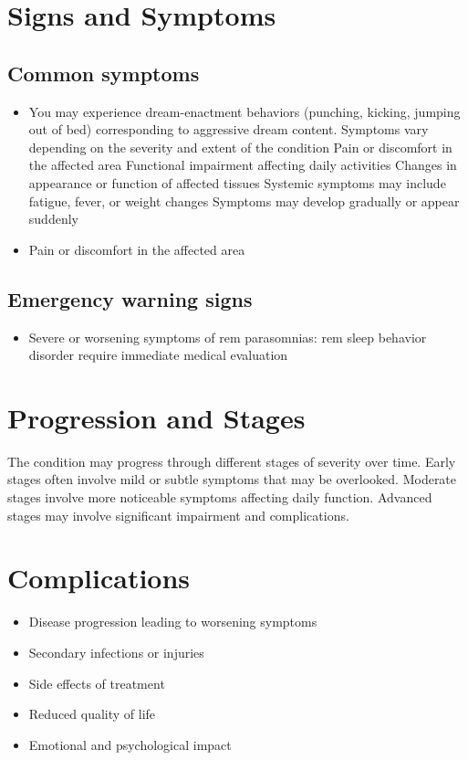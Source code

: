 \section{Signs and Symptoms}

\subsection{Common symptoms}
\begin{itemize}[noitemsep]
  \item You may experience dream-enactment behaviors (punching, kicking, jumping out of bed) corresponding to aggressive dream content. Symptoms vary depending on the severity and extent of the condition Pain or discomfort in the affected area Functional impairment affecting daily activities Changes in appearance or function of affected tissues Systemic symptoms may include fatigue, fever, or weight changes Symptoms may develop gradually or appear suddenly
  \item Pain or discomfort in the affected area
  \end{itemize}

\subsection{Emergency warning signs}
\begin{itemize}[noitemsep]
  \item Severe or worsening symptoms of rem parasomnias: rem sleep behavior disorder require immediate medical evaluation
\end{itemize}
\section{Progression and Stages}
The condition may progress through different stages of severity over time. Early stages often involve mild or subtle symptoms that may be overlooked. Moderate stages involve more noticeable symptoms affecting daily function. Advanced stages may involve significant impairment and complications.
\section{Complications}
\begin{itemize}[noitemsep]
  \item Disease progression leading to worsening symptoms
  \item Secondary infections or injuries
  \item Side effects of treatment
  \item Reduced quality of life
  \item Emotional and psychological impact
\end{itemize}
